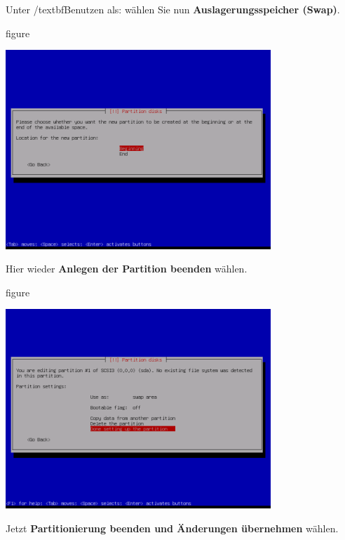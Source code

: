\pagebreak
Unter /textbf{Benutzen als:} wählen Sie nun \textbf{Auslagerungsspeicher (Swap)}.

\begin{nofloat}{figure}
\begin{center}
\includegraphics[width=0.75\textwidth]{screenshots/18_ubuntu_install.png}
\end{center}
\end{nofloat}

Hier wieder \textbf{Anlegen der Partition beenden} wählen.

\begin{nofloat}{figure}
\begin{center}
\includegraphics[width=0.75\textwidth]{screenshots/19_ubuntu_install.png}
\end{center}
\end{nofloat}

\pagebreak
Jetzt \textbf{Partitionierung beenden und Änderungen übernehmen} wählen.

